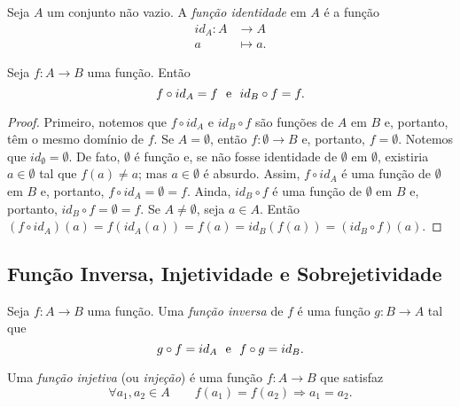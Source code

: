 \begin{defi}
	Seja $A$ um conjunto não vazio. A \emph{função identidade} em $A$ é a função
	\begin{align*}
	id_A : A &\to A \\
			a &\mapsto a.
	\end{align*}
\end{defi}

\begin{prop}
\label{prop:id.comp.func}
	Seja $f: A \to B$ uma função. Então
	\begin{equation*}
	f \circ id_A = f \text{\ \ e\ \ } id_B \circ f = f.
	\end{equation*}
\end{prop}
\begin{proof}
	Primeiro, notemos que $f \circ id_A$ e $id_B \circ f$ são funções de $A$ em $B$ e, portanto, têm o mesmo domínio de $f$. Se $A = \emptyset$, então $f: \emptyset \to B$ e, portanto, $f=\emptyset$. Notemos que $id_\emptyset = \emptyset$. De fato, $\emptyset$ é função e, se não fosse identidade de $\emptyset$ em $\emptyset$, existiria $a \in \emptyset$ tal que $f(a) \neq a$; mas $a \in \emptyset$ é absurdo. Assim, $f \circ id_A$ é uma função de $\emptyset$ em $B$ e, portanto, $f \circ id_A = \emptyset = f$. Ainda, $id_B \circ f$ é uma função de $\emptyset$ em $B$ e, portanto, $id_B \circ f = \emptyset = f$. Se $A \neq \emptyset$, seja $a \in A$. Então $(f \circ id_A) (a) = f(id_A(a)) = f(a) = id_B(f(a)) = (id_B \circ f) (a)$.
\end{proof}

\subsection{Função Inversa, Injetividade e Sobrejetividade}

\begin{defi}
	Seja $f: A \to B$ uma função. Uma \emph{função inversa} de $f$ é uma função $g: B \to A$ tal que
	\begin{equation*}
	g \circ f = id_A \text{\ \ e\ \ } f \circ g = id_B.
	\end{equation*}
\end{defi}

\begin{defi}
	Uma \emph{função injetiva} (ou \emph{injeção}) é uma função $f: A \to B$ que satisfaz
	\begin{equation*}
	\forall a_1,a_2 \in A \qquad f(a_1)=f(a_2) \Rightarrow a_1=a_2.
	\end{equation*}
\end{defi}

